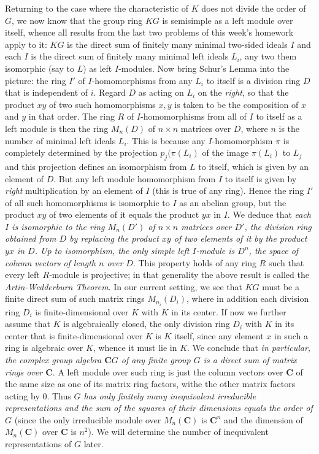 \documentclass[10pt]{article}
\begin{document}
Returning to the case where the characteristic of $K$ does not divide
the order of $G$, we now know that the group ring $KG$ is semisimple as
a left module over itself, whence all results from the last two problems
of this week's homework apply to it: $KG$ is the direct sum of finitely
many minimal two-sided ideals $I$ and each $I$ is the direct sum of
finitely many minimal left ideals $L_i$, any two them isomorphic (say to
$L$) as left $I$-modules. Now bring Schur's Lemma into the picture: the
ring $I'$ of $I$-homomorphisms from any $L_i$ to itself is a division
ring $D$ that is independent of $i$. Regard $D$ as acting on $L_i$ on
the {\sl right}, so that the product $xy$ of two such homomorphisms
$x,y$ is taken to be the composition of $x$ and $y$ in that order. The
ring $R$ of $I$-homomorphisms from all of $I$ to itself as a left module
is then the ring $M_n(D)$ of $n\times n$ matrices over $D$, where $n$ is
the number of minimal left ideals $L_i$. This is because any
$I$-homomorphism $\pi$ is completely determined by the projection
$p_j(\pi(L_i)$ of the image $\pi(L_i)$ to $L_j$ and this projection
defines an isomorphism from $L$ to itself, which is given by an element
of $D$. But any left module homomorphism from $I$ to itself is given by
{\sl right} multiplication by an element of $I$ (this is true of any
ring). Hence the ring $I'$ of all such homomorphisms is isomorphic to
$I$ as an abelian group, but the product $xy$ of two elements of it
equals the product $yx$ in $I$. We deduce that {\sl each $I$ is
  isomorphic to the ring $M_n (D')$ of $n \times n$ matrices over $D'$,
  the division ring obtained from $D$ by replacing the product $xy$ of
  two elements of it by the product $yx$ in $D$. Up to isomorphism, the
  only simple left $I$-module is $D^n$, the space of column vectors of
  length $n$ over $D$}. This property holds of any ring $R$ such that
every left $R$-module is projective; in that generality the above result
is called the {\sl Artin-Wedderburn Theorem}. In our current setting, we
see that $KG$ must be a finite direct sum of such matrix rings
$M_{n_i}(D_i)$, where in addition each division ring $D_i$ is
finite-dimensional over $K$ with $K$ in its center. If now we further
assume that $K$ is algebraically closed, the only division ring $D_i$
with $K$ in its center that is finite-dimensional over $K$ is $K$
itself, since any element $x$ in such a ring is algebraic over $K$,
whence it must lie in $K$. We conclude that {\sl in particular, the
  complex group algebra $\mathbf CG$ of any finite group $G$ is a direct
  sum of matrix rings over $\mathbf C$}. A left module over such ring is
just the column vectors over $\mathbf C$ of the same size as one of its
matrix ring factors, withe the other matrix factors acting by 0. Thus
{\sl $G$ has only finitely many inequivalent irreducible representations
  and the sum of the squares of their dimensions equals the order of
  $G$} (since the only irreducible module over $M_n(\mathbf C)$ is
$\mathbf C^n$ and the dimension of $M_n(\mathbf C)$ over $\mathbf C$ is
$n^2$). We will determine the number of inequivalent representations of
$G$ later.
\end{document}
